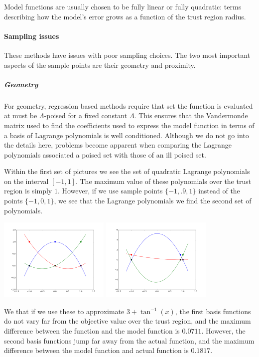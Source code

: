 \documentclass{article}
\begin{document}
Model functions are usually chosen to be fully linear or fully quadratic: terms describing how the model's error grows as a function of the trust region radius.

\paragraph{Sampling issues}

These methods have issues with poor sampling choices.
The two most important aspects of the sample points are their geometry and proximity.

\subparagraph{Geometry}
For geometry, regression based methods require that set the function is evaluated at must be $\Lambda$-poised for a fixed constant $\Lambda$.
This ensures that the Vandermonde matrix used to find the coefficients used to express the model function in terms of a basis of Lagrange polynomials is well conditioned.
Although we do not go into the details here, problems become apparent when comparing the Lagrange polynomials associated a poised set with those of an ill poised set.

Within the first set of pictures we see the set of quadratic Lagrange polynomials on the interval $[-1,1]$.
The maximum value of these polynomials over the trust region is simply $1$.
However, if we use sample points $\{-1, .9, 1\}$ instead of the points $\{-1, 0, 1\}$,
we see that the Lagrange polynomials we find the second set of polynomials.

\includegraphics[width=200px]{poised.png}
\includegraphics[width=200px]{illpoised.png}

We that if we use these to approximate $3 + \tan^{-1}(x)$, the first basis functions do not vary far from the objective value over the trust region, and the maximum difference between the function and the model function is $0.0711$.
However, the second basis functions jump far away from the actual function, and the maximum difference between the model function and actual function is 
$0.1817$.
\end{document}
